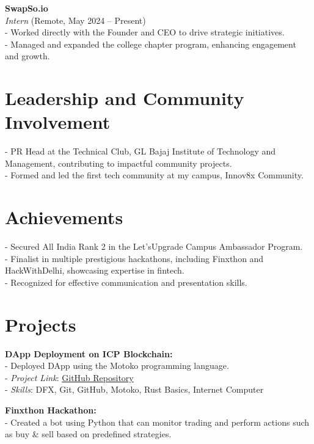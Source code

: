 \documentclass[10pt,a4paper]{article}
\begin{document}
\textbf{SwapSo.io} \\
\textit{Intern} (Remote, May 2024 – Present) \\
- Worked directly with the Founder and CEO to drive strategic initiatives. \\
- Managed and expanded the college chapter program, enhancing engagement and growth.

\vspace{1cm}

\section*{Leadership and Community Involvement}
- PR Head at the Technical Club, GL Bajaj Institute of Technology and Management, contributing to impactful community projects. \\
- Formed and led the first tech community at my campus, Innov8x Community.

\vspace{1cm}

\section*{Achievements}
- Secured All India Rank 2 in the Let'sUpgrade Campus Ambassador Program. \\
- Finalist in multiple prestigious hackathons, including Finxthon and HackWithDelhi, showcasing expertise in fintech. \\
- Recognized for effective communication and presentation skills.

\vspace{1cm}

\section*{Projects}

\textbf{DApp Deployment on ICP Blockchain:} \\
- Deployed DApp using the Motoko programming language. \\
- \textit{Project Link}: \href{https://github.com/Harsh-8899/ICP-Project1}{GitHub Repository} \\
- \textit{Skills}: DFX, Git, GitHub, Motoko, Rust Basics, Internet Computer

\vspace{0.5cm}

\textbf{Finxthon Hackathon:} \\
- Created a bot using Python that can monitor trading and perform actions such as buy \& sell based on predefined strategies.
\end{document}
